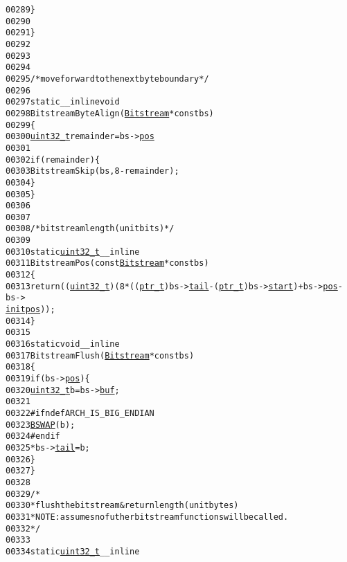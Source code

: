 \begin{footnotesize}
\begin{alltt}
00289         \}
00290 
00291 \}
00292 
00293 
00294 
00295 \textcolor{comment}{/* move forward to the next byte boundary */}
00296 
00297 \textcolor{keyword}{static} \_\_inline \textcolor{keywordtype}{void}
00298 BitstreamByteAlign(\hyperlink{struct_bitstream}{Bitstream} * \textcolor{keyword}{const} bs)
00299 \{
00300         \hyperlink{_types_8h_a04909d1366bb244ff2482beb51635f37}{uint32_t} remainder = bs->\hyperlink{struct_bitstream_ac7479c4c4e57d10bbfdd90baf6e731a4}{pos} % 8;
00301 
00302         \textcolor{keywordflow}{if} (remainder) \{
00303                 BitstreamSkip(bs, 8 - remainder);
00304         \}
00305 \}
00306 
00307 
00308 \textcolor{comment}{/* bitstream length (unit bits) */}
00309 
00310 \textcolor{keyword}{static} \hyperlink{_types_8h_a04909d1366bb244ff2482beb51635f37}{uint32_t} \_\_inline
00311 BitstreamPos(\textcolor{keyword}{const} \hyperlink{struct_bitstream}{Bitstream} * \textcolor{keyword}{const} bs)
00312 \{
00313         \textcolor{keywordflow}{return}((\hyperlink{_types_8h_a04909d1366bb244ff2482beb51635f37}{uint32_t})(8*((\hyperlink{_types_8h_a9c9021e43aafc3d7fd2068cd742bad2c}{ptr_t})bs->\hyperlink{struct_bitstream_addd740548c260796cf01e55597f749c6}{tail} - (\hyperlink{_types_8h_a9c9021e43aafc3d7fd2068cd742bad2c}{ptr_t})bs->\hyperlink{struct_bitstream_a4c2cb09a4fee7ed90d05f8b40914911e}{start}) + bs->\hyperlink{struct_bitstream_ac7479c4c4e57d10bbfdd90baf6e731a4}{pos} - bs->
      \hyperlink{struct_bitstream_a3234ef24b4ec8a9d06731d4f2db67418}{initpos}));
00314 \}
00315 
00316 \textcolor{keyword}{static} \textcolor{keywordtype}{void} \_\_inline
00317 BitstreamFlush(\hyperlink{struct_bitstream}{Bitstream}* \textcolor{keyword}{const} bs)
00318 \{
00319     \textcolor{keywordflow}{if} (bs->\hyperlink{struct_bitstream_ac7479c4c4e57d10bbfdd90baf6e731a4}{pos}) \{
00320         \hyperlink{_types_8h_a04909d1366bb244ff2482beb51635f37}{uint32_t} b = bs->\hyperlink{struct_bitstream_aa6e7d5fa7c3bcfaac4cda5c4b07f8aa1}{buf};
00321 
00322 \textcolor{preprocessor}{#ifndef ARCH\_IS\_BIG\_ENDIAN}
00323 \textcolor{preprocessor}{}        \hyperlink{_macros_8h_acd886eee9738d4807d25c1baac1e839e}{BSWAP}(b);
00324 \textcolor{preprocessor}{#endif}
00325 \textcolor{preprocessor}{}        *bs->\hyperlink{struct_bitstream_addd740548c260796cf01e55597f749c6}{tail} = b;
00326     \}
00327 \}
00328 
00329 \textcolor{comment}{/*}
00330 \textcolor{comment}{ * flush the bitstream & return length (unit bytes)}
00331 \textcolor{comment}{ * NOTE: assumes no futher bitstream functions will be called.}
00332 \textcolor{comment}{ */}
00333 
00334 \textcolor{keyword}{static} \hyperlink{_types_8h_a04909d1366bb244ff2482beb51635f37}{uint32_t} \_\_inline

\end{alltt}
\end{footnotesize}
